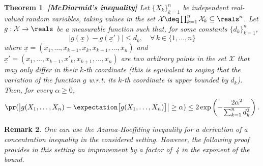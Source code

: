 \documentclass{article}
\theoremstyle{plain}
\newtheorem{theorem}{Theorem}[section]
\newtheorem{remark}[theorem]{Remark}
\begin{document}
\begin{theorem}{\bf[McDiarmid's inequality]}
Let $\{X_k\}_{k=1}^n$ be independent real-valued random variables,
taking values in the set
$\mathcal{X} \deq \prod_{k=1}^n \mathcal{X}_k \subseteq \reals^n$.
Let $g: \mathcal{X} \rightarrow \reals$ be a measurable function
such that, for some constants $\{d_k\}_{k=1}^n$,
\begin{equation}
\bigl| g(\underline{x}) - g(\underline{x}') \bigr| \leq d_k,
\quad \forall \, k \in \{1, \ldots, n\}
\label{eq: assumption on the variation of g}
\end{equation}
where $\underline{x} = (x_1, \ldots, x_{k-1}, x_k, x_{k+1}, \ldots, x_n)$
and $\underline{x}' = (x_1, \ldots, x_{k-1}, x'_k, x_{k+1}, \ldots, x_n)$
are two arbitrary points in the set $\mathcal{X}$ that may only differ in their
$k$-th coordinate (this is equivalent to saying that the variation of the
function $g$ w.r.t. its $k$-th coordinate is upper bounded by $d_k$).
Then, for every $\alpha \geq 0$,
\begin{equation}
\pr( \bigl| g(X_1, \ldots, X_n) - \expectation \bigl[g(X_1, \ldots, X_n) \bigr] \bigr|
\geq \alpha) \leq 2 \exp \left(-\frac{2 \alpha^2}{\sum_{k=1}^n d_k^2} \right).
\label{eq: McDiarmid's inequality}
\end{equation}
\label{theorem: McDiarmid's inequality}
\end{theorem}

\begin{remark}
One can use the Azuma-Hoeffding inequality for a derivation of a
concentration inequality in the considered setting. However, the following
proof provides in this setting an improvement by a factor of~4 in the exponent
of the bound.
\end{remark}
\end{document}
